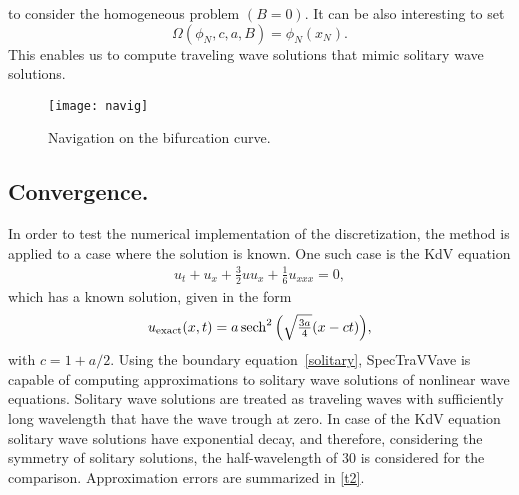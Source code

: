 	 to consider the homogeneous problem $(B=0)$.
	It can be also interesting to set
\begin{equation}
	\Omega(\phi_N, c, a, B) = \phi_N(x_N). \label{solitary}
\end{equation}
	 This enables us to compute traveling wave solutions that mimic solitary wave solutions. 	
\begin{figure}
\centering
		\texttt{[image: navig]}
\caption{\small Navigation on the bifurcation curve.}
\label{navig}
\end{figure} 


\subsection{Convergence.}
In order to test the numerical implementation of the discretization,
the method is applied to a case where the solution is known.
One such case is the KdV equation
\begin{align*}
u_t + u_x + \frac{3}{2} u u_x + \frac{1}{6}u_{xxx} = 0, 
\end{align*}
which has a known solution, given in the form
\begin{align*}
u_{\mathrm{exact}}(x,t) = a \operatorname{sech}^2\Big( {\textstyle\sqrt{\frac{3a}{4}}} (x-c t)\Big),\\
\end{align*}
with $c=1+a/2$.
%
Using the boundary equation~\eqref{solitary}, \textsf{SpecTraVVave} is capable of computing 
approximations to solitary wave solutions of nonlinear wave equations. 
Solitary wave solutions are treated as traveling waves with sufficiently long wavelength 
that have the wave trough at zero.
In case of the KdV equation solitary wave solutions have exponential decay, 
and therefore, considering the symmetry of solitary solutions, 
the half-wavelength of $30$ is considered for the comparison. 
Approximation errors are summarized in \autoref{t2}.
%
